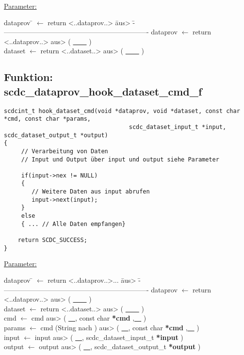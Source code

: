 \underline{Parameter:}
\begin{tabbing}
dataprov \= $\leftarrow$ return <..dataprov..> \= aus> \= ----------------------------------------------------------------- \kill
dataprov \> $\leftarrow$ return <..dataprov..> \> aus> \> ( \underline{~~~~} )\\
dataset  \> $\leftarrow$ return <..dataset..>  \> aus> \> ( \underline{~~~~} )\\
\end{tabbing}

\subsection{\textbf{Funktion:} scdc\_dataprov\_hook\_dataset\_cmd\_f}\label{scdc_dataprov_hook_dataset_cmd_f}
\begin{lstlisting}[escapechar={~}]
scdcint_t hook_dataset_cmd(void *dataprov, void *dataset, const char *cmd, const char *params,
                                    scdc_dataset_input_t *input, scdc_dataset_output_t *output)
{
	 // Verarbeitung von Daten
	 // Input und Output über input und output siehe Parameter
	 
	 if(input->nex != NULL)
	 {
	 	// Weitere Daten aus input abrufen
	 	input->next(input);
	 }
	 else
	 { ... // Alle Daten empfangen}
    
	return SCDC_SUCCESS;	
}

\end{lstlisting}

\underline{Parameter:}
\begin{tabbing}
dataprov \= $\leftarrow$ return <..dataprov..>... \= aus> \= ----------------------------------------------------------------- \kill
dataprov \> $\leftarrow$ return <..dataprov..>    \> aus> \> ( \underline{~~~~} )\\
dataset  \> $\leftarrow$ return <..dataset..>     \> aus> \> ( \underline{~~~~} )\\

cmd      \> $\leftarrow$ cmd                      \> aus> \> ( \underline{~~}, const char \textbf{*cmd} ,\underline{~~} )\\
params   \> $\leftarrow$ cmd (String nach \qqq{~})\> aus> \> ( \underline{~~}, const char \textbf{*cmd} ,\underline{~~} )\\
input    \> $\leftarrow$ input                    \> aus> \> ( \underline{~~}, scdc\_dataset\_input\_t \textbf{*input} )\\
output   \> $\leftarrow$ output                   \> aus> \> ( \underline{~~}, scdc\_dataset\_output\_t \textbf{*output} )\\
\end{tabbing}


